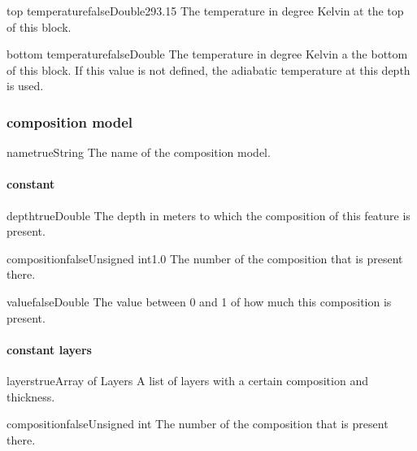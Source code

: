 \documentclass{book}
\begin{document}
\begin{parameterbox}{top temperature}{false}{Double}{293.15}
The temperature in degree Kelvin at the top of this block.
\end{parameterbox}

\begin{parameterbox}{bottom temperature}{false}{Double}{}
The temperature in degree Kelvin a the bottom of this block. If this value is not defined, the adiabatic temperature at this depth is used.
\end{parameterbox}

\subsubsection{composition model}
\begin{parameterbox}{name}{true}{String}{}
The name of the composition model.
\end{parameterbox}

\paragraph{constant}
\begin{parameterbox}{depth}{true}{Double}{}
The depth in meters to which the composition of this feature is present.
\end{parameterbox}

\begin{parameterbox}{composition}{false}{Unsigned int}{1.0}
The number of the composition that is present there.
\end{parameterbox}

\begin{parameterbox}{value}{false}{Double}{}
The value between 0 and 1 of how much this composition is present.
\end{parameterbox}

\paragraph{constant layers}
\begin{parameterbox}{layers}{true}{Array of Layers}{}
A list of layers with a certain composition and thickness.
\end{parameterbox}

\begin{parameterbox}{composition}{false}{Unsigned int}{}
The number of the composition that is present there.
\end{parameterbox}
\end{document}
